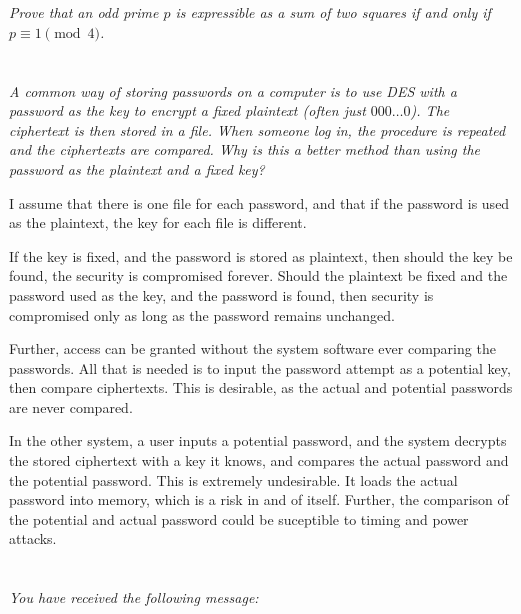 \documentclass[12pt]{article}
\begin{document}
\newpage

\section{} \textit{Prove that an odd prime $p$ is expressible as a sum of two squares if and only if $p \equiv 1 \pmod{4}$.}

\newpage

\section{} \textit{A common way of storing passwords on a computer is to use DES with a password as the key to encrypt a fixed plaintext (often just $000\dots0$). The ciphertext is then stored in a file. When someone log in, the procedure is repeated and the ciphertexts are compared. Why is this a better method than using the password as the plaintext and a fixed key?}

    I assume that there is one file for each password, and that if the password is used as the plaintext, the key for each file is different.

    If the key is fixed, and the password is stored as plaintext, then should the key be found, the security is compromised forever. Should the plaintext be fixed and the password used as the key, and the password is found, then security is compromised only as long as the password remains unchanged.

    Further, access can be granted without the system software ever comparing the passwords. All that is needed is to input the password attempt as a potential key, then compare ciphertexts. This is desirable, as the actual and potential passwords are never compared.

    In the other system, a user inputs a potential password, and the system decrypts the stored ciphertext with a key it knows, and compares the actual password and the potential password. This is extremely undesirable. It loads the actual password into memory, which is a risk in and of itself. Further, the comparison of the potential and actual password could be suceptible to timing and power attacks.

\newpage

\section{} \textit{You have received the following message:}
\end{document}
